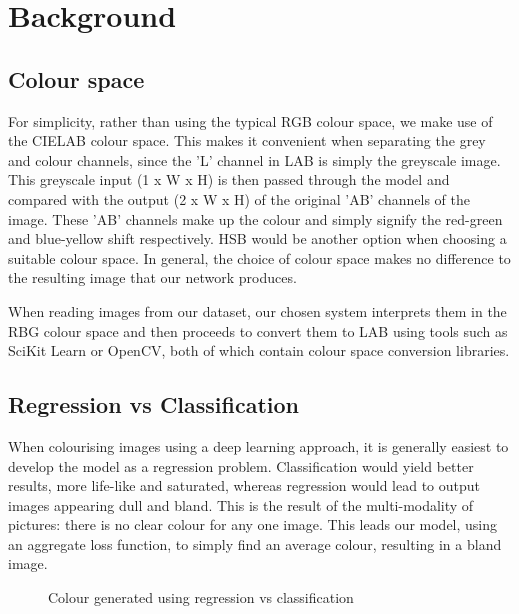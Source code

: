 \documentclass[conference]{IEEEtran}
\begin{document}
\section{Background}

\subsection{Colour space}

For simplicity, rather than using the typical RGB colour space, we make use of the CIELAB colour space. This makes it convenient when separating the grey and colour channels, since the 'L' channel in LAB is simply the greyscale image. This greyscale input (1 x W x H) is then passed through the model and compared with the output (2 x W x H) of the original 'AB' channels of the image. These 'AB' channels make up the colour and simply signify the red-green and blue-yellow shift respectively. HSB would be another option when choosing a suitable colour space. In general, the choice of colour space makes no difference to the resulting image that our network produces.

When reading images from our dataset, our chosen system interprets them in the RBG colour space and then proceeds to convert them to LAB using tools such as SciKit Learn or OpenCV, both of which contain colour space conversion libraries. 

\subsection{Regression vs Classification}

When colourising images using a deep learning approach, it is generally easiest to develop the model as a regression problem. Classification would yield better results, more life-like and saturated, whereas regression would lead to output images appearing dull and bland. This is the result of the multi-modality of pictures: there is no clear colour for any one image. This leads our model, using an aggregate loss function, to simply find an average colour, resulting in a bland image.

\begin{figure}[h]
    \centering
    \qquad
    \caption{Colour generated using regression vs classification \cite{zhang2016colorful}}%
    \label{fig:reg_vs_class}
\end{figure}
\end{document}
